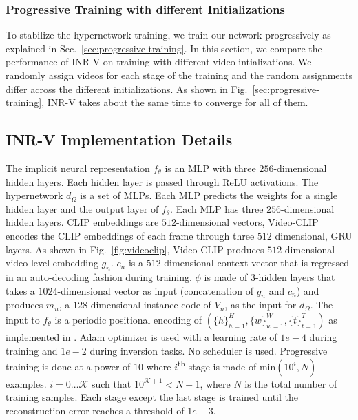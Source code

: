 \documentclass[10pt]{article} \usepackage[accepted]{tmlr}
\begin{document}
\subsubsection{Progressive Training with different Initializations}

To stabilize the hypernetwork training, we train our network progressively as explained in Sec.~\ref{sec:progressive-training}. In this section, we compare the performance of INR-V on training with different video intializations. We randomly assign videos for each stage of the training and the random assignments differ across the different initializations. As shown in Fig.~\ref{sec:progressive-training}, INR-V takes about the same time to converge for all of them.


\subsection{INR-V Implementation Details}
\label{sec:appendix-archdets}

The implicit neural representation $f_\theta$ is an MLP with three $256$-dimensional hidden layers. 
Each hidden layer is passed through ReLU activations. The hypernetwork $d_\Omega$ is a set of MLPs. Each MLP predicts the weights for a single hidden layer and the output layer of $f_\theta$. Each MLP has three $256$-dimensional hidden layers. CLIP embeddings are $512$-dimensional vectors, Video-CLIP encodes the CLIP embeddings of each frame through three $512$ dimensional, GRU layers. As shown in Fig.~\ref{fig:videoclip}, Video-CLIP produces $512$-dimensional video-level embedding $g_n$. $c_n$ is a $512$-dimensional context vector that is regressed in an auto-decoding fashion during training. $\phi$ is made of $3$-hidden layers that takes a $1024$-dimensional vector as input (concatenation of $g_n$ and $c_n$) and produces $m_n$, a $128$-dimensional instance code of $V_n$, as the input for $d_\Omega$. The input to $f_\theta$ is a periodic positional encoding of $(\{h\}_{h=1}^{H},\{w\}_{w=1}^{W},\{t\}_{t=1}^{T})$ 
as implemented in \cite{lfns}. Adam optimizer is used with a learning rate of $1e-4$ during training and $1e-2$ during inversion tasks. No scheduler is used. Progressive training is done at a power of $10$ where $i$\textsuperscript{th} stage is made of min$(10^{i}, N)$ examples. $i = 0\dots\mathcal{K}$ such that $10^{\mathcal{K}+1} < N+1$, where $N$ is the total number of training samples. Each stage except the last stage is trained until the reconstruction error reaches a threshold of $1e-3$.
\end{document}
